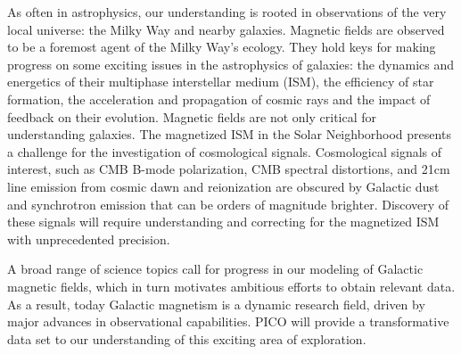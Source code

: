 \documentclass[PICOReport.tex]{subfiles}
\begin{document}
As often in astrophysics, our understanding is rooted in observations of the very local universe: the Milky Way and nearby galaxies. Magnetic fields are observed to be a foremost agent of the Milky Way's ecology. They hold keys for making progress on some exciting issues in the astrophysics of galaxies: the dynamics and energetics of their multiphase interstellar medium (ISM), the efficiency of star formation, the acceleration and propagation of cosmic rays and the impact of feedback on their evolution. Magnetic fields are not only critical for understanding galaxies. The magnetized ISM in the Solar Neighborhood presents a challenge for the investigation of cosmological signals. Cosmological signals of interest, such as CMB B-mode polarization, CMB spectral distortions, and 21cm line emission from cosmic dawn and reionization are obscured by Galactic dust and synchrotron emission that can be orders of magnitude brighter. Discovery of these signals will require understanding and correcting for the magnetized ISM with unprecedented precision.  

A broad range of science topics call for progress in our modeling of Galactic magnetic fields, which in turn motivates ambitious efforts to obtain relevant data. As a result, today Galactic magnetism is a dynamic research field, driven by major advances in observational capabilities. PICO will provide a transformative data set to our understanding of this exciting area of exploration.
\end{document}
